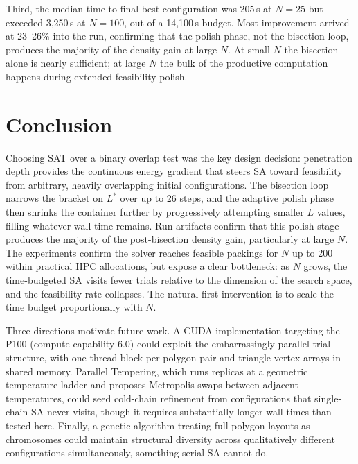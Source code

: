 \documentclass[10pt,twocolumn]{article}
\begin{document}
Third, the median time to final best configuration was 205\,s at
$N = 25$ but exceeded 3{,}250\,s at $N = 100$, out of a 14{,}100\,s
budget. Most improvement arrived at 23--26\% into the run, confirming
that the polish phase, not the bisection loop, produces the majority
of the density gain at large $N$. At small $N$ the bisection alone is
nearly sufficient; at large $N$ the bulk of the productive computation
happens during extended feasibility polish.

\section{Conclusion}
\label{sec:conclusion}

Choosing SAT over a binary overlap test was the key design decision:
penetration depth provides the continuous energy gradient that steers
SA toward feasibility from arbitrary, heavily overlapping initial
configurations. The bisection loop narrows the bracket on $L^*$ over
up to 26 steps, and the adaptive polish phase then shrinks the
container further by progressively attempting smaller $L$ values,
filling whatever wall time remains. Run artifacts confirm that this
polish stage produces the majority of the post-bisection density gain,
particularly at large $N$. The
experiments confirm the solver reaches feasible packings for $N$ up to
200 within practical HPC allocations, but expose a clear bottleneck:
as $N$ grows, the time-budgeted SA visits fewer trials relative to the
dimension of the search space, and the feasibility rate collapses. The
natural first intervention is to scale the time budget proportionally
with $N$.

Three directions motivate future work. A CUDA implementation targeting
the P100 (compute capability 6.0) could exploit the embarrassingly
parallel trial structure, with one thread block per polygon pair and
triangle vertex arrays in shared memory. Parallel Tempering, which
runs replicas at a geometric temperature ladder and proposes Metropolis
swaps between adjacent temperatures, could seed cold-chain refinement
from configurations that single-chain SA never visits, though it
requires substantially longer wall times than tested here. Finally, a
genetic algorithm treating full polygon layouts as chromosomes could
maintain structural diversity across qualitatively different
configurations simultaneously, something serial SA cannot do.
\end{document}
